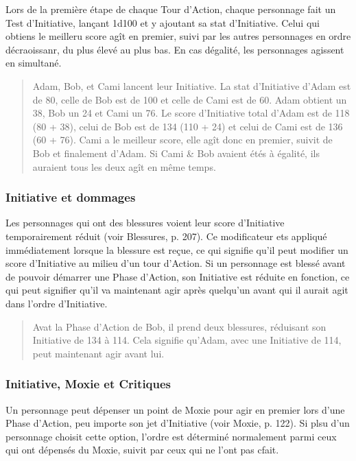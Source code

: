 Lors de la première étape de chaque Tour d'Action, chaque personnage fait un Test d'Initiative, lançant 1d100 et y ajoutant sa stat d'Initiative. Celui qui obtiens le meilleru score agît en premier, suivi par les autres personnages en ordre décraoissanr, du plus élevé au plus bas. En cas dégalité, les personnages agissent en simultané. 

\begin{quotation} Adam, Bob, et Cami lancent leur Initiative. La stat d'Initiative d'Adam est de 80, celle de Bob est de 100 et celle de Cami est de 60. Adam obtient un 38, Bob un 24 et Cami un 76. Le score d'Initiative total d'Adam est de 118 (80 + 38), celui de Bob est de 134 (110 + 24) et celui de Cami est de 136 (60 + 76). Cami a le meilleur score, elle agît donc en premier, suivit de Bob et finalement d'Adam. Si Cami \& Bob avaient étés à égalité, ils auraient tous les deux agît en même temps. \end{quotation} 

\subsubsection{Initiative et dommages} 

Les personnages qui ont des blessures voient leur score d'Initiative temporairement réduit (voir Blessures, p. 207). Ce modificateur ets appliqué immédiatement lorsque la blessure est reçue, ce qui signifie qu'il peut modifier un score d'Initiative au milieu d'un tour d'Action. Si un personnage est blessé avant de pouvoir démarrer une Phase d'Action, son Initiative est réduite en fonction, ce qui peut signifier qu'il va maintenant agir après quelqu'un avant qui il aurait agit dans l'ordre d'Initiative. 

\begin{quotation} Avat la Phase d'Action de Bob, il prend deux blessures, réduisant son Initiative de 134 à 114. Cela signifie qu'Adam, avec une Initiative de 114, peut maintenant agir avant lui. \end{quotation} 

\subsubsection{Initiative, Moxie et Critiques} 

Un personnage peut dépenser un point de Moxie pour agir en premier lors d'une Phase d'Action, peu importe son jet d'Initiative (voir Moxie, p. 122). Si plsu d'un personnage choisit cette option, l'ordre est déterminé normalement parmi ceux qui ont dépensés du Moxie, suivit par ceux qui ne l'ont pas cfait. 

